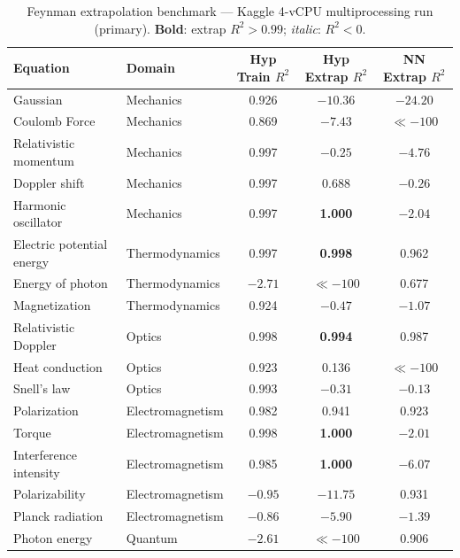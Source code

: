 \documentclass[twoside,11pt]{article}
\newcommand{\Rsq}{R^{2}}
\begin{document}
\begin{table}[h]
\centering
\caption{Feynman extrapolation benchmark — Kaggle 4-vCPU multiprocessing run (primary).
  \textbf{Bold}: extrap $\Rsq > 0.99$; \emph{italic}: $\Rsq < 0$.}
\label{tab:feynman30}
\small\setlength{\tabcolsep}{4.5pt}
\renewcommand{\arraystretch}{1.08}
\begin{tabular}{llccc}
\toprule
\textbf{Equation} & \textbf{Domain} &
\textbf{Hyp Train $\Rsq$} & \textbf{Hyp Extrap $\Rsq$} & \textbf{NN Extrap $\Rsq$} \\
\midrule
Gaussian                  & Mechanics      & 0.926 & $-10.36$           & $-24.20$ \\
Coulomb Force             & Mechanics      & 0.869 & $-7.43$            & $\ll{-}100$ \\
Relativistic momentum     & Mechanics      & 0.997 & $-0.25$            & $-4.76$ \\
Doppler shift             & Mechanics      & 0.997 & 0.688              & $-0.26$ \\
Harmonic oscillator       & Mechanics      & 0.997 & \textbf{1.000}     & $-2.04$ \\
Electric potential energy & Thermodynamics & 0.997 & \textbf{0.998}     & 0.962 \\
Energy of photon          & Thermodynamics & $-2.71$ & $\ll{-}100$      & 0.677 \\
Magnetization             & Thermodynamics & 0.924 & $-0.47$            & $-1.07$ \\
Relativistic Doppler      & Optics         & 0.998 & \textbf{0.994}     & 0.987 \\
Heat conduction           & Optics         & 0.923 & 0.136              & $\ll{-}100$ \\
Snell's law               & Optics         & 0.993 & $-0.31$            & $-0.13$ \\
Polarization              & Electromagnetism & 0.982 & 0.941            & 0.923 \\
Torque                    & Electromagnetism & 0.998 & \textbf{1.000}   & $-2.01$ \\
Interference intensity    & Electromagnetism & 0.985 & \textbf{1.000}   & $-6.07$ \\
Polarizability            & Electromagnetism & $-0.95$ & $-11.75$       & 0.931 \\
Planck radiation          & Electromagnetism & $-0.86$ & $-5.90$        & $-1.39$ \\
Photon energy             & Quantum        & $-2.61$ & $\ll{-}100$      & 0.906 \\

\end{tabular}
\end{table}
\end{document}
